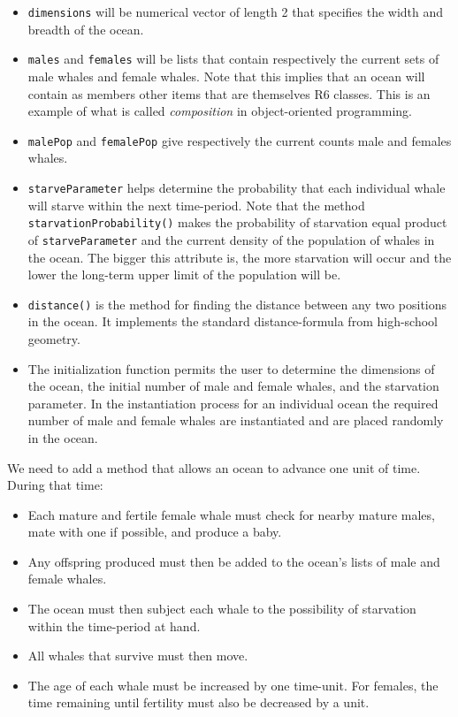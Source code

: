 \documentclass[]{book}
\providecommand{\tightlist}{%
  \setlength{\itemsep}{0pt}\setlength{\parskip}{0pt}}
\theoremstyle{definition}
\theoremstyle{definition}
\theoremstyle{definition}
\theoremstyle{remark}
\begin{document}
{\begin{itemize}
\tightlist
\item
  \texttt{dimensions} will be numerical vector of length 2 that
  specifies the width and breadth of the ocean.
\item
  \texttt{males} and \texttt{females} will be lists that contain
  respectively the current sets of male whales and female whales. Note
  that this implies that an ocean will contain as members other items
  that are themselves R6 classes. This is an example of what is called
  \emph{composition} in object-oriented programming.
\item
  \texttt{malePop} and \texttt{femalePop} give respectively the current
  counts male and females whales.
\item
  \texttt{starveParameter} helps determine the probability that each
  individual whale will starve within the next time-period. Note that
  the method \texttt{starvationProbability()} makes the probability of
  starvation equal product of \texttt{starveParameter} and the current
  density of the population of whales in the ocean. The bigger this
  attribute is, the more starvation will occur and the lower the
  long-term upper limit of the population will be.
\item
  \texttt{distance()} is the method for finding the distance between any
  two positions in the ocean. It implements the standard
  distance-formula from high-school geometry.
\item
  The initialization function permits the user to determine the
  dimensions of the ocean, the initial number of male and female whales,
  and the starvation parameter. In the instantiation process for an
  individual ocean the required number of male and female whales are
  instantiated and are placed randomly in the ocean.
\end{itemize}

We need to add a method that allows an ocean to advance one unit of
time. During that time:

\begin{itemize}
\tightlist
\item
  Each mature and fertile female whale must check for nearby mature
  males, mate with one if possible, and produce a baby.
\item
  Any offspring produced must then be added to the ocean's lists of male
  and female whales.
\item
  The ocean must then subject each whale to the possibility of
  starvation within the time-period at hand.
\item
  All whales that survive must then move.
\item
  The age of each whale must be increased by one time-unit. For females,
  the time remaining until fertility must also be decreased by a unit.
\end{itemize}

}
\end{document}
